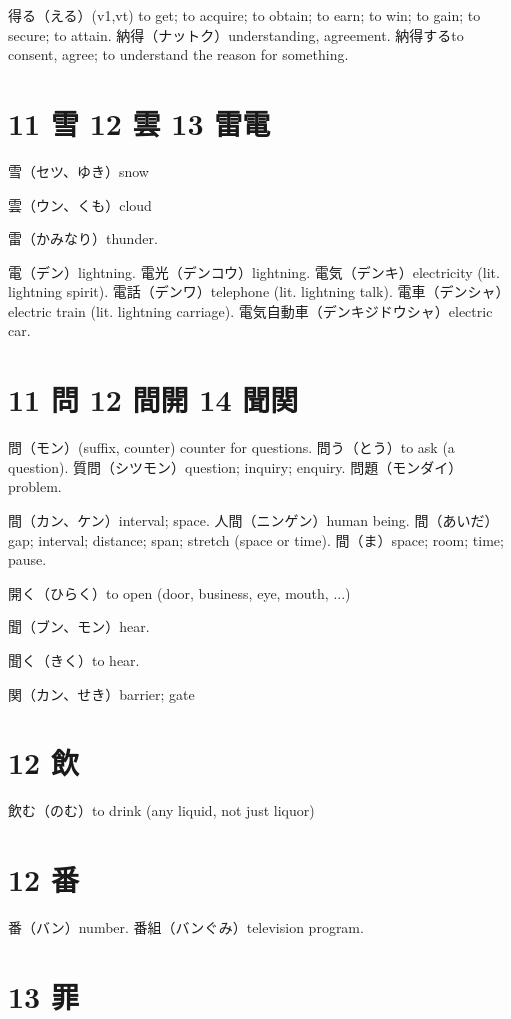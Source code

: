 得る（える）(v1,vt) to get; to acquire; to obtain; to earn; to win; to gain; to secure; to attain.
納得（ナットク）understanding, agreement.
納得するto consent, agree; to understand the reason for something.

\section{11 雪 12 雲 13 雷電}

雪（セツ、ゆき）snow

雲（ウン、くも）cloud

雷（かみなり）thunder.

電（デン）lightning.
電光（デンコウ）lightning.
電気（デンキ）electricity (lit. lightning spirit).
電話（デンワ）telephone (lit. lightning talk).
電車（デンシャ）electric train (lit. lightning carriage).
電気自動車（デンキジドウシャ）electric car.

\section{11 問 12 間開 14 聞関}

問（モン）(suffix, counter) counter for questions.
問う（とう）to ask (a question).
質問（シツモン）question; inquiry; enquiry.
問題（モンダイ）problem.

間（カン、ケン）interval; space.
人間（ニンゲン）human being.
間（あいだ）gap; interval; distance; span; stretch (space or time).
間（ま）space; room; time; pause.

開く（ひらく）to open (door, business, eye, mouth, ...)

聞（ブン、モン）hear.

聞く（きく）to hear.

関（カン、せき）barrier; gate

\section{12 飲}

飲む（のむ）to drink (any liquid, not just liquor)

\section{12 番}

番（バン）number.
番組（バンぐみ）television program.

\section{13 罪}

